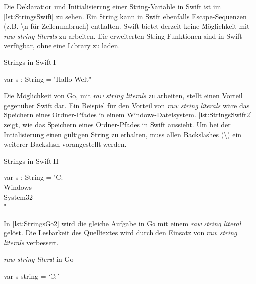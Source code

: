 Die Deklaration und Initialisierung einer String-Variable in Swift ist im \autoref{lst:StringsSwift} zu sehen.
Ein String kann in Swift ebenfalls Escape-Sequenzen (z.B. {\textbackslash}n für Zeilenumbruch) enthalten.
Swift bietet derzeit keine Möglichkeit mit \emph{raw string literals} zu arbeiten. 
Die erweiterten String-Funktionen sind in Swift verfügbar, ohne eine Library zu laden.

\begin{listing}[H]
\caption{Strings in Swift I}
\label{lst:StringsSwift}
\begin{SwiftCode}
var s : String = "Hallo Welt"
\end{SwiftCode}
\end{listing}

Die Möglichkeit von Go, mit \emph{raw string literals} zu arbeiten, stellt einen Vorteil gegenüber Swift dar. 
Ein Beispiel für den Vorteil von \emph{raw string literals} wäre das Speichern eines Ordner-Pfades in einem Windows-Dateisystem.
\autoref{lst:StringsSwift2} zeigt, wie das Speichern eines Ordner-Pfades in Swift aussieht.
Um bei der Intialisierung einen gültigen String zu erhalten, muss allen Backslashes (\textbackslash) ein weiterer Backslash vorangestellt werden. 

\begin{listing}[H]
\caption{Strings in Swift II}
\label{lst:StringsSwift2}
\begin{SwiftCode}
var s : String = "C:\\Windows\\System32\\"
\end{SwiftCode}
\end{listing}

In \autoref{lst:StringsGo2} wird die gleiche Aufgabe in Go mit einem \emph{raw string literal} gelöst. 
Die Lesbarkeit des Quelltextes wird durch den Einsatz von \emph{raw string literals} verbessert.

\begin{listing}[H]
\caption{\textit{raw string literal} in Go}
\label{lst:StringsGo2}
\begin{GoCode}
var s string = `C:\Windows{}\`
\end{GoCode}
\end{listing}



